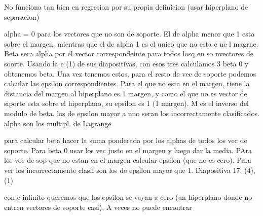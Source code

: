 No funciona tan bien en regresion por su propia definicion (usar hiperplano de separacion)


\begin{example}
alpha = 0 para los vectores que no son de soporte. El de alpha menor que 1 esta sobre el margen, mientras que el de alpha 1 es el unico que no esta e ne l magrne. Beta sera alpha por el vector correspondeinte para todos losq eu so nvectores de soorte. Usando la e (1) de sus diapositivas, con esos tres calculamos 3 beta 0 y obtenemos beta. Una vez tenemos estos, para el resto de vec de soporte podemos calcular las epsilon correspondientes. Para el que no esta en el margen, tiene la distancia del margen al hiperplano es 1 margen, y como el que no es vector de siporte esta sobre el hiperplano, su epsilon es 1 (1 margen). M es el inverso del modulo de beta. los de epsilon mayor a uno seran los incorrectamente clasificados.   \\


alpha son los multipl. de Lagrange

para calcular beta hacer la suma ponderada por los alphas de todos los vec de soporte. Para beta 0 usar los vec justo en el margen y luego dar la media. PAra los vec de sop que no estan en el margen calcular epsilon (que no es cero). Para ver los incorrectamente clasif son los de epsilon mayor que 1. Diapositiva 17. (4), (1)
\end{example}

con c infinito queremos que los epsilon se vayan a cero (un hiperplano donde no entren vectores de soporte casi). A veces no puede encontrar 